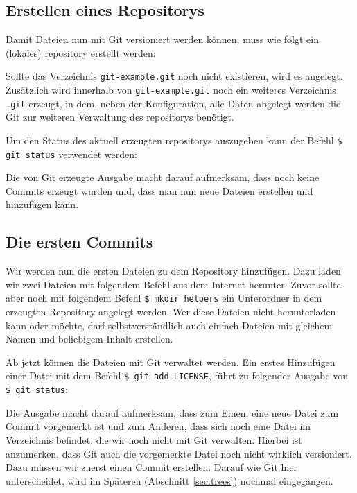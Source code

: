 \subsection{Erstellen eines Repositorys}\label{startup}
Damit Dateien nun mit Git versioniert werden können, muss wie folgt ein
(lokales) \gls{repository} erstellt werden:


Sollte das Verzeichnis \texttt{git-example.git} noch nicht existieren, wird
es angelegt. Zusätzlich wird innerhalb von \texttt{git-example.git} noch ein
weiteres Verzeichnis \texttt{.git} erzeugt, in dem, neben der Konfiguration,
alle Daten abgelegt werden die Git zur weiteren Verwaltung des \glspl{repository}
benötigt.

Um den Status des aktuell erzeugten \glspl{repository} auszugeben kann der
Befehl \texttt{\$ git status} verwendet werden:


Die von Git erzeugte Ausgabe macht darauf aufmerksam, dass noch keine Commits
erzeugt wurden und, dass man nun neue Dateien erstellen und hinzufügen kann.

\subsection{Die ersten Commits}\label{sec:first_commits}

Wir werden nun die ersten Dateien zu dem Repository hinzufügen. Dazu laden wir
zwei Dateien mit folgendem Befehl aus dem Internet herunter. Zuvor sollte aber
noch mit folgendem Befehl \texttt{\$ mkdir helpers} ein Unterordner in dem
erzeugten Repository angelegt werden. Wer diese Dateien nicht herunterladen
kann oder möchte, darf selbstverständlich auch einfach Dateien mit gleichem
Namen und beliebigem Inhalt erstellen.


Ab jetzt können die Dateien mit Git verwaltet werden. Ein erstes Hinzufügen
einer Datei mit dem Befehl \texttt{\$ git add LICENSE}, führt zu folgender
Ausgabe von \texttt{\$ git status}:


Die Ausgabe macht darauf aufmerksam, dass zum Einen, eine neue Datei zum Commit
vorgemerkt ist und zum Anderen, dass sich noch eine Datei im Verzeichnis
befindet, die wir noch nicht mit Git verwalten. Hierbei ist anzumerken, dass
Git auch die vorgemerkte Datei noch nicht wirklich versioniert. Dazu müssen wir
zuerst einen Commit erstellen. Darauf wie Git hier unterscheidet, wird im
Späteren (Abschnitt \ref{sec:trees}) nochmal eingegangen.

